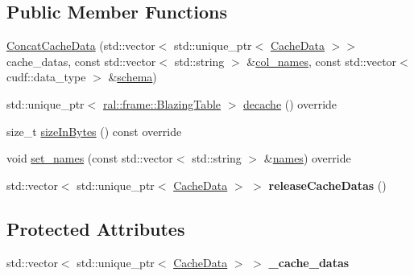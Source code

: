 \subsection*{Public Member Functions}
\begin{DoxyCompactItemize}
\item 
\hyperlink{classral_1_1cache_1_1ConcatCacheData_a9b88f49d90532642cb20be1de7f414c5}{Concat\+Cache\+Data} (std\+::vector$<$ std\+::unique\+\_\+ptr$<$ \hyperlink{classral_1_1cache_1_1CacheData}{Cache\+Data} $>$$>$ cache\+\_\+datas, const std\+::vector$<$ std\+::string $>$ \&\hyperlink{classral_1_1cache_1_1CacheData_a7a43a46a362c8fe93a7af81debbeca1b}{col\+\_\+names}, const std\+::vector$<$ cudf\+::data\+\_\+type $>$ \&\hyperlink{classral_1_1cache_1_1CacheData_aec9a1b3c0fb78cfdb3bd5494bcee2d8f}{schema})
\item 
std\+::unique\+\_\+ptr$<$ \hyperlink{classral_1_1frame_1_1BlazingTable}{ral\+::frame\+::\+Blazing\+Table} $>$ \hyperlink{classral_1_1cache_1_1ConcatCacheData_af726fc27fcf1621fff1f399f8b2d3cec}{decache} () override
\item 
size\+\_\+t \hyperlink{classral_1_1cache_1_1ConcatCacheData_a25914d06c36e4a1748dc9479adc5ccd8}{size\+In\+Bytes} () const override
\item 
void \hyperlink{classral_1_1cache_1_1ConcatCacheData_a02f400f33f88ba3e216f5899fa4f12b8}{set\+\_\+names} (const std\+::vector$<$ std\+::string $>$ \&\hyperlink{classral_1_1cache_1_1CacheData_aa2c8d58823d781cc1f8e6e589d897642}{names}) override
\item 
\mbox{\label{classral_1_1cache_1_1ConcatCacheData_ab6b4c1d4bd8752827d522d8911547a1e}} 
std\+::vector$<$ std\+::unique\+\_\+ptr$<$ \hyperlink{classral_1_1cache_1_1CacheData}{Cache\+Data} $>$ $>$ {\bfseries release\+Cache\+Datas} ()
\end{DoxyCompactItemize}
\subsection*{Protected Attributes}
\begin{DoxyCompactItemize}
\item 
\mbox{\label{classral_1_1cache_1_1ConcatCacheData_a420b449b6862f7db831e7e51acb6fee5}} 
std\+::vector$<$ std\+::unique\+\_\+ptr$<$ \hyperlink{classral_1_1cache_1_1CacheData}{Cache\+Data} $>$ $>$ {\bfseries \+\_\+cache\+\_\+datas}
\end{DoxyCompactItemize}

